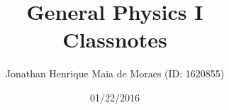\title{General Physics I \\ Classnotes}
\author{Jonathan Henrique Maia de Moraes (ID: 1620855)}
\date{01/22/2016}
\maketitle
